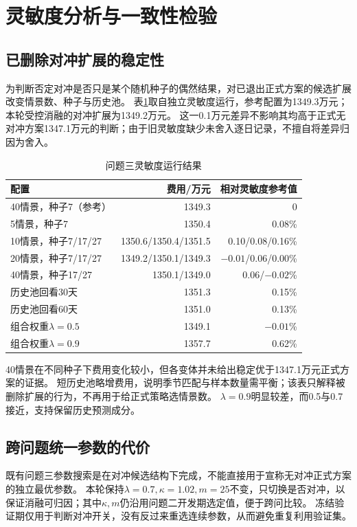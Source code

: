\section{灵敏度分析与一致性检验}
\subsection{已删除对冲扩展的稳定性}
为判断否定对冲是否只是某个随机种子的偶然结果，对已退出正式方案的候选扩展改变情景数、种子与历史池。
表\ref{tab:sens}取自独立灵敏度运行，参考配置为1349.3万元；本轮受控消融的对冲扩展为1349.2万元。
这一0.1万元差异不影响其均高于正式无对冲方案1347.1万元的判断；由于旧灵敏度缺少未舍入逐日记录，不擅自将差异归因为舍入。
\begin{table}[htbp]\centering
\caption{问题三灵敏度运行结果}\label{tab:sens}
\begin{tabular}{lrr}
\toprule
配置 & 费用/万元 & 相对灵敏度参考值\\\midrule
40情景，种子7（参考） & 1349.3 & 0\\
5情景，种子7 & 1350.4 & 0.08\%\\
10情景，种子7/17/27 & 1350.6/1350.4/1351.5 & 0.10/0.08/0.16\%\\
20情景，种子7/17/27 & 1349.2/1350.1/1349.3 & $-0.01$/0.06/0.00\%\\
40情景，种子17/27 & 1350.1/1349.0 & 0.06/$-0.02$\%\\
历史池回看30天 & 1351.3 & 0.15\%\\
历史池回看60天 & 1351.0 & 0.13\%\\
组合权重$\lambda=0.5$ & 1349.1 & $-0.01$\%\\
组合权重$\lambda=0.9$ & 1357.7 & 0.62\%\\
\bottomrule
\end{tabular}
\end{table}
40情景在不同种子下费用变化较小，但各变体并未给出稳定优于1347.1万元正式方案的证据。
短历史池略增费用，说明季节匹配与样本数量需平衡；该表只解释被删除扩展的行为，不再用于给正式策略选情景数。
$\lambda=0.9$明显较差，而0.5与0.7接近，支持保留历史预测成分。

\subsection{跨问题统一参数的代价}
既有问题三参数搜索是在对冲候选结构下完成，不能直接用于宣称无对冲正式方案的独立最优参数。
本轮保持$\lambda=0.7,\kappa=1.02,m=25$不变，只切换是否对冲，以保证消融可归因；其中$\kappa,m$仍沿用问题二开发期选定值，便于跨问比较。
冻结验证期仅用于判断对冲开关，没有反过来重选连续参数，从而避免重复利用验证集。
